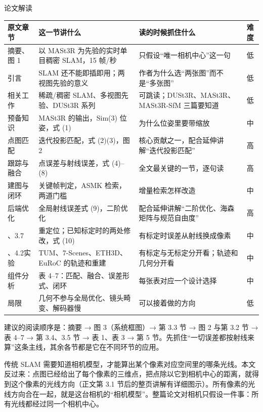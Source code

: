 \begin{interp}{论文解读}
\begin{center}
\small
\renewcommand{\arraystretch}{1.35}
\begin{tabular}{>{\raggedright\arraybackslash}p{2.9cm}>{\raggedright\arraybackslash}p{6.3cm}>{\raggedright\arraybackslash}p{6.2cm}c}
\toprule
原文章节 & 这一节讲什么 & 读的时候抓住什么 & 难度\\
\midrule
摘要、图 1 & 以 MASt3R 为先验的实时单目稠密 SLAM，15 帧/秒 & 只假设“唯一相机中心”这一句 & 低\\
1\enspace 引言 & SLAM 还不能即插即用；两视图先验的意义 & 作者为什么选“两张图”而不是“多张图” & 低\\
2\enspace 相关工作 & 稀疏/稠密 SLAM、多视图先验、DUSt3R 系列 & 可跳读；DUSt3R、MASt3R、MASt3R-SfM 三篇要知道 & 低\\
3.1\enspace 预备知识 & MASt3R 的输出，Sim(3) 位姿，式 (1) & 为什么位姿里要带缩放 & 中\\
3.2\enspace 点图匹配 & 迭代投影匹配，式 (2)(3)，图 2 & 核心贡献之一，配合延伸讲解“迭代投影匹配” & 高\\
3.3\enspace 跟踪与融合 & 点误差与射线误差，式 (4)--(8) & 全文最关键的一节，逐句读 & 高\\
3.4\enspace 建图与闭环 & 关键帧判定，ASMK 检索，两道门槛 & 增量检索怎样改造 & 中\\
3.5\enspace 后端优化 & 全局射线误差式 (9)，二阶优化 & 配合延伸讲解“二阶优化、海森矩阵与规范自由度” & 高\\
3.6、3.7 & 重定位；已知标定时的两处修改，式 (10) & 有标定时误差从射线换成像素 & 中\\
4.1、4.2\enspace 实验 & TUM、7-Scenes、ETH3D、EuRoC 的轨迹和重建 & 有标定与无标定分开看；轨迹和几何分开看 & 中\\
4.4\enspace 组件分析 & 表 4--7：匹配、融合、误差形式、闭环 & 每张表对应一个设计选择 & 中\\
5\enspace 局限 & 几何不参与全局优化、镜头畸变、解码器慢 & 可以接着做的方向 & 低\\
\bottomrule
\end{tabular}
\end{center}

建议的阅读顺序是：摘要 → 图 3（系统框图）→ 第 3.3 节 → 图 2 与第 3.2 节 → 表 4--7 → 第 3.4、3.5 节 → 表 1、表 3 → 第 5 节。先抓住“一切误差都按射线来算”这条主线，其余各节都是它在不同环节的应用。



传统 SLAM 需要知道相机模型，才能算出某个像素对应空间里的哪条光线。本文反过来：点图已经给出了每个像素的三维点，把点除以它到相机中心的距离，就得到这个像素的光线方向（正文第 3.1 节后的整页讲解有详细图示）。所有像素的光线方向合在一起，就是这台相机的“相机模型”。整篇论文对相机只假设一件事：所有光线都经过同一个相机中心。


\end{interp}
